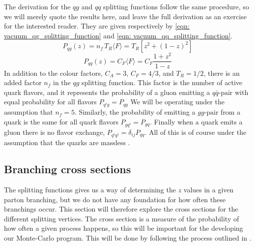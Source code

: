 \documentclass[main.tex]{subfiles}
\begin{document}
The derivation for the \(qg\) and \(qq\) splitting functions follow the same procedure, so we will merely quote the results here, and leave the full derivation as an exercise for the interested reader. They are given respectively by \autoref{eqn: vacuum_qg_splitting_function} and \autoref{eqn: vacuum_qq_splitting_function}.
\begin{equation}\label{eqn: vacuum_qg_splitting_function}
    P_{qg}(z) = n_f \, T_R \langle F \rangle = T_R \left[ z^2 + (1-z)^2 \right] 
\end{equation}
\begin{equation}\label{eqn: vacuum_qq_splitting_function}
    P_{qq} (z) = C_F \langle F \rangle = C_F \frac{1+z^2}{1-z}
\end{equation}
In addition to the colour factors, \(C_A = 3\), \(C_F=4/3\), and \(T_R=1/2\), there is an added factor \(n_f\) in the \(qg\) splitting function. This factor is the number of active quark flavors, and it represents the probability of a gluon emitting a \(q\bar q\text{-pair}\) with equal probability for all flavors \(P_{q^ig} = P_{qg}\) We will be operating under the assumption that \(n_f = 5\). Similarly, the probability of emitting a \(gg\text{-pair}\) from a quark is the same for all quark flavors \(P_{gq^i} = P_{gq}\). Finally when a quark emits a gluon there is no flavor exchange, \(P_{q^iq^j} = \delta_{ij} P_{qq}\). All of this is of course under the assumption that the quarks are massless \cite{AltarelliParisi_original}.

\subsection{Branching cross sections}
The splitting functions gives us a way of determining the \(z\) values in a given parton branching, but we do not have any foundation for how often these branchings occur. This section will therefore explore the cross sections for the different splitting vertices. The cross section is a measure of the probability of how often a given process happens, so this will be important for the developing our Monte-Carlo program. This will be done by following the process outlined in \cite[p.164]{ellis_stirling_webber_1996}.
\end{document}
